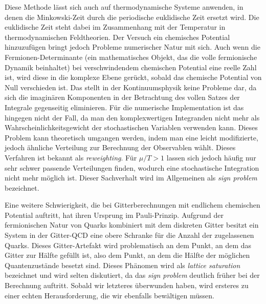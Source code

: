 {Diese Methode lässt sich auch auf thermodynamische Systeme anwenden, in denen
die Minkowski-Zeit durch die periodische euklidische Zeit ersetzt wird. Die
euklidische Zeit steht dabei im Zusammenhang mit der Temperatur in
thermodynamischen Feldtheorien. Der Versuch ein chemisches Potential
hinzuzufügen bringt jedoch Probleme numerischer Natur mit sich. Auch wenn die
Fermionen-Determinante (ein mathematisches Objekt, das die volle fermionische
Dynamik beinhaltet) bei verschwindendem chemischen Potential eine reelle Zahl
ist, wird diese in die komplexe Ebene gerückt, sobald das chemische Potential
von Null verschieden ist. Das stellt in der Kontinuumsphysik keine Probleme dar,
da sich die imaginären Komponenten in der Betrachtung des vollen Satzes der
Integrale gegenseitig eliminieren. Für die numerische Implementation ist das
hingegen nicht der Fall, da man den komplexwertigen Integranden nicht mehr als
Wahrscheinlichkeitsgewicht der stochastischen Variablen verwenden kann. Dieses
Problem kann theoretisch umgangen werden, indem man eine leicht modifizierte,
jedoch ähnliche Verteilung zur Berechnung der Observablen wählt. Dieses
Verfahren ist bekannt als \emph{reweighting}. Für $\mu / T > 1$ lassen sich
jedoch häufig nur sehr schwer passende Verteilungen finden, wodurch eine
stochastische Integration nicht mehr möglich ist. Dieser Sachverhalt wird im
Allgemeinen als \emph{sign problem} bezeichnet.

Eine weitere Schwierigkeit, die bei Gitterberechnungen mit endlichem chemischen
Potential auftritt, hat ihren Ursprung im Pauli-Prinzip. Aufgrund der
fermionischen Natur von Quarks kombiniert mit dem diskreten Gitter besitzt ein
System in der Gitter-QCD eine obere Schranke für die Anzahl der zugelassenen
Quarks. Dieses Gitter-Artefakt wird problematisch an dem Punkt, an dem das
Gitter zur Hälfte gefüllt ist, also dem Punkt, an dem die Hälfte der möglichen
Quantenzustände besetzt sind. Dieses Phänomen wird als \emph{lattice saturation}
bezeichnet und wird selten diskutiert, da das \emph{sign problem} deutlich
früher bei der Berechnung auftritt. Sobald wir letzteres überwunden haben, wird
ersteres zu einer echten Herausforderung, die wir ebenfalls bewältigen müssen.

}
